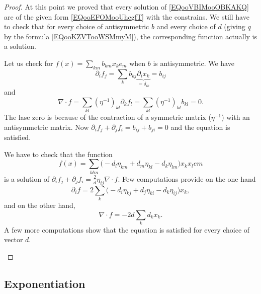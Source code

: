 \begin{proof}
	At this point we proved that every solution of \eqref{EQooVBIMooOBKAKQ} are of the given form \eqref{EQooEFOMooUhcgfT} with the constrains. We still have to check that for every choice of antisymmetric \( b\) and every choice of \( d\) (giving \( q\) by the formula \eqref{EQooKZVTooWSMmyM}), the corresponding function actually is a solution.

	\begin{subproof}
		\spitem[Antisymmetric]
		Let us check for \( f(x)=\sum_{km}b_{km}x_ke_m\) when \( b\) is antisymmetric. We have
		\begin{equation}
			\partial_if_j=\sum_kb_{kj}\underbrace{\partial_ix_k}_{=\delta_{ik}}=b_{ij}
		\end{equation}
		and
		\begin{equation}
			\nabla\cdot f=\sum_{kl}(\eta^{-1})_{kl}\partial_kf_l=\sum_{kl}(\eta^{-1})_{kl}b_{kl}=0.
		\end{equation}
		The lase zero is because of the contraction of a symmetric matrix (\( \eta^{-1}\)) with an antisymmetric matrix. Now \( \partial_if_j+\partial_jf_i=b_{ij}+b_{ji}=0\) and the equation is satisfied.

		We have to check that the function
		\begin{equation}
			f(x)=\sum_{klm}\big( -d_l\eta_{km}+d_m\eta_{kl}-d_k\eta_{lm} \big)x_kx_lem
		\end{equation}
		is a solution of \( \partial_if_j+\partial_jf_i=\frac{ 2 }{ d }\eta_{ij}\nabla\cdot f\). Few computations provide on the one hand
		\begin{equation}
			\partial_if=2\sum_k\big( -d_i\eta_{kj}+d_j\eta_{ki}-d_k\eta_{ij} \big)x_k,
		\end{equation}
		and on the other hand,
		\begin{equation}
			\nabla\cdot f=-2d\sum_kd_kx_k.
		\end{equation}
		A few more computations show that the equation is satisfied for every choice of vector \( d\).
	\end{subproof}
\end{proof}

\subsection{Exponentiation}

